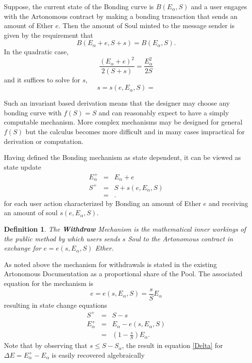\documentclass[11pt]{amsart}
\newtheorem{definition}{Definition}
\begin{document}
Suppose, the current state of the Bonding curve is $B(E_\alpha, S)$ and a user engages with the Artonomous contract by making a bonding transaction that sends an amount of Ether $e$. Then the amount of Soul minted to the message sender is given by the requirement that
\begin{equation}
B(E_\alpha+e, S+s) = B(E_\alpha, S).
\end{equation} 
In the quadratic case,
\begin{equation}
\frac{(E_\alpha+e)^2}{2(S+s)} = \frac{E_\alpha^2}{2S}
\end{equation} 
and it suffices to solve for $s$,
\begin{equation}
s = s(e,E_\alpha, S) = 
\end{equation}

Such an invariant based derivation means that the designer may choose any bonding curve with $f(S)=S$ and can reasonably expect to have a simply computable mechanism. More complex mechanisms may be designed for general $f(S)$ but the calculus becomes more difficult and in many cases impractical for derivation or computation.

Having defined the Bonding mechanism as state dependent, it can be viewed as state update
\begin{eqnarray}
E_\alpha^+ &=& E_\alpha + e \\
S^+ &=& S+s(e,E_\alpha, S)\\
&=& .
\end{eqnarray}
for each user action characterized by Bonding an amount of Ether $e$ and receiving an amount of soul $s(e,E_\alpha, S)$.

\begin{definition}
The \textbf{Withdraw} Mechanism is the mathematical inner workings of the public method by which users sends $s$ Soul to the Artonomous contract in exchange for $e=e(s,E_\alpha, S)$ Ether. 
\end{definition}

As noted above the mechanism for withdrawals is stated in the existing Artonomous Documentation as a proportional share of the Pool. The associated equation for the mechanism is
\begin{equation}
e=e(s,E_\alpha, S) = \frac{s}{S} E_\alpha
\end{equation}
resulting in state change equations
\begin{eqnarray}
S^+ &=& S-s\\
E_\alpha^+ &=& E_\alpha - e(s,E_\alpha, S)\\
&=& \left(1-\frac{s}{S}\right) E_\alpha.
\end{eqnarray}
Note that by observing that $s\le S-S_\alpha$, the result in equation \eqref{Delta} for $\Delta E = E^+_\alpha - E_\alpha$ is easily recovered algebraically
\end{document}
